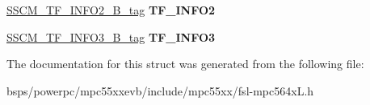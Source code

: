 \begin{DoxyCompactItemize}
\item 
\mbox{\label{structSSCM__struct__tag_aef8f27f3524b6ae4bee0fe2d9ea271f1}} 
\mbox{\hyperlink{unionSSCM__TF__INFO2__32B__tag}{S\+S\+C\+M\+\_\+\+T\+F\+\_\+\+I\+N\+F\+O2\+\_\+B\+\_\+tag}} {\bfseries T\+F\+\_\+\+I\+N\+F\+O2}
\item 
\mbox{\label{structSSCM__struct__tag_acf3a1492d79f8fd0841d88d2f3d82b77}} 
\mbox{\hyperlink{unionSSCM__TF__INFO3__32B__tag}{S\+S\+C\+M\+\_\+\+T\+F\+\_\+\+I\+N\+F\+O3\+\_\+B\+\_\+tag}} {\bfseries T\+F\+\_\+\+I\+N\+F\+O3}
\end{DoxyCompactItemize}


The documentation for this struct was generated from the following file\+:\begin{DoxyCompactItemize}
\item 
bsps/powerpc/mpc55xxevb/include/mpc55xx/fsl-\/mpc564x\+L.\+h\end{DoxyCompactItemize}
